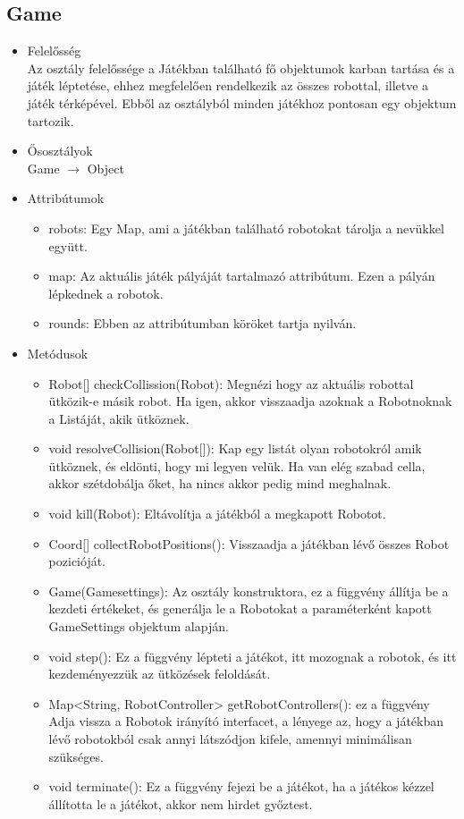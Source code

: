 \subsection{Game}
\begin{itemize}
	\item Felelősség\\
	Az osztály felelőssége a Játékban található fő objektumok karban tartása és a játék léptetése, ehhez megfelelően rendelkezik az összes robottal, illetve a játék térképével. Ebből az osztályból minden játékhoz pontosan egy objektum tartozik.
	\item Ősosztályok\\
	Game $\rightarrow$ Object
	\item Attribútumok\\
	\begin{itemize}
		\item robots: Egy Map, ami a játékban található robotokat tárolja a nevükkel együtt.
		\item map: Az aktuális játék pályáját tartalmazó attribútum. Ezen a pályán lépkednek a robotok.
		\item rounds: Ebben az attribútumban köröket tartja nyilván.
	\end{itemize}
	\item Metódusok\\
	\begin{itemize}
		\item Robot[] checkCollission(Robot): Megnézi hogy az aktuális robottal ütközik-e másik robot. Ha igen, akkor visszaadja azoknak a Robotnoknak a Listáját, akik ütköznek.
		\item void resolveCollision(Robot[]): Kap egy listát olyan robotokról amik ütköznek, és eldönti, hogy mi legyen velük. Ha van elég szabad cella, akkor szétdobálja őket, ha nincs akkor pedig mind meghalnak.
		\item void kill(Robot): Eltávolítja a játékból a megkapott Robotot.
		\item Coord[] collectRobotPositions(): Visszaadja a játékban lévő összes Robot pozicióját.
		\item Game(Gamesettings): Az osztály konstruktora, ez a függvény állítja be a kezdeti értékeket, és generálja le a Robotokat a paraméterként kapott GameSettings objektum alapján.
		\item void step(): Ez a függvény lépteti a játékot, itt mozognak a robotok, és itt kezdeményezzük az ütközések feloldását.
		\item Map<String, RobotController> getRobotControllers(): ez a függvény Adja vissza a Robotok irányító interfacet, a lényege az, hogy a játékban lévő robotokból csak annyi látszódjon kifele, amennyi minimálisan szükséges.
		\item void terminate(): Ez a függvény fejezi be a játékot, ha a játékos kézzel állította le a játékot, akkor nem hirdet győztest.
	\end{itemize}
\end{itemize}

